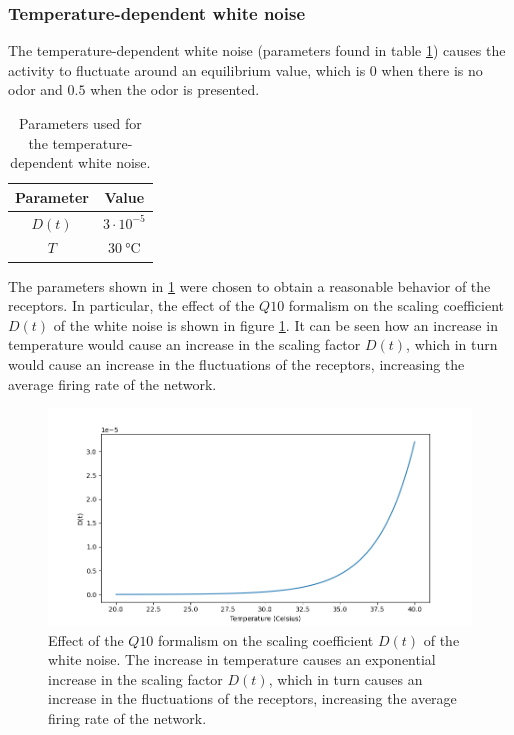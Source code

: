     \subsubsection{Temperature-dependent white noise}
    The temperature-dependent white noise  (parameters found in table \ref{tab:temperature-params}) causes the activity to fluctuate around an equilibrium value, which is $0$ when there is no odor and $0.5$ when the odor is presented.

    \begin{table}
      \centering
      \begin{tabular}{ c c }
        \hline
        Parameter & Value \\
        \hline
        $D(t)$ & $3\cdot 10^{-5}$ \\
        $T$ & $\SI{30}{\celsius}$ \\
        \hline
      \end{tabular}
      \caption{Parameters used for the temperature-dependent white noise.}
      \label{tab:temperature-params}
    \end{table}

    The parameters shown in \ref{tab:temperature-params} were chosen to obtain a reasonable behavior of the receptors.
    In particular, the effect of the $Q10$ formalism on the scaling coefficient $D(t)$ of the white noise is shown in figure \ref{fig:q10}.
    It can be seen how an increase in temperature would cause an increase in the scaling factor $D(t)$, which in turn would cause an increase in the fluctuations of the receptors, increasing the average firing rate of the network.

    \begin{figure}
      \centering
      \includegraphics[width=\textwidth]{q10}
      \caption{Effect of the $Q10$ formalism on the scaling coefficient $D(t)$ of the white noise. The increase in temperature causes an exponential increase in the scaling factor $D(t)$, which in turn causes an increase in the fluctuations of the receptors, increasing the average firing rate of the network.}
      \label{fig:q10}
    \end{figure}

